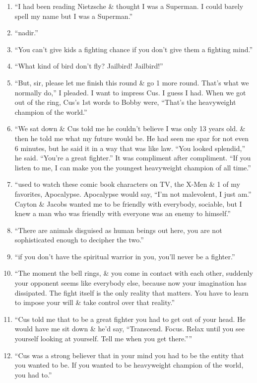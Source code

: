 \documentclass{article}
\numberwithin{equation}{section}
\begin{document}
\begin{enumerate}
	\item ``I had been reading Nietzsche \& thought I was a Superman. I could barely spell my name but I was a Superman.''
	\item ``nadir.''
	\item ``You can't give kids a fighting chance if you don't give them a fighting mind.''
	\item ``What kind of bird don't fly? Jailbird! Jailbird!''
	\item ``But, sir, please let me finish this round \& go 1 more round. That's what we normally do,'' I pleaded. I want to impress Cus. I guess I had. When we got out of the ring, Cus's 1st words to Bobby were, ``That's the heavyweight champion of the world.''
	\item ``We sat down \& Cus told me he couldn't believe I was only 13 years old. \& then he told me what my future would be. He had seen me spar for not even 6  minutes, but he said it in a way that was like law. ``You looked splendid,'' he said. ``You're a great fighter.'' It was compliment after compliment. ``If you listen to me, I can make you the youngest heavyweight champion of all time.''
	\item ``used to watch these comic book characters on TV, the X-Men \& 1 of my favorites, Apocalypse. Apocalypse would say, ``I'm not malevolent, I just am.'' Cayton \& Jacobs wanted me to be friendly with everybody, sociable, but I knew a man who was friendly with everyone was an enemy to himself.''
	\item ``There are animals disguised as human beings out here, you are not sophisticated enough to decipher the two.''
	\item ``if you don't have the spiritual warrior in you, you'll never be a fighter.''
	\item ``The moment the bell rings, \& you come in contact with each other, suddenly your opponent seems like everybody else, because now your imagination has dissipated. The fight itself is the only reality that matters. You have to learn to impose your will \& take control over that reality.''
	\item ``Cus told me that to be a great fighter you had to get out of your head. He would have me sit down \& he'd say, ``Transcend. Focus. Relax until you see yourself looking at yourself. Tell me when you get there.''''
	\item ``Cus was a strong believer that in your mind you had to be the entity that you wanted to be. If you wanted to be heavyweight champion of the world, you had to.''

\end{enumerate}
\end{document}
